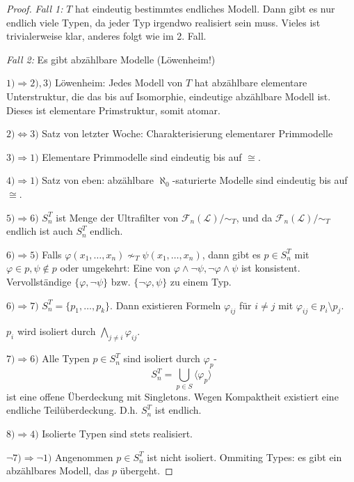 \documentclass[12pt,parskip=full]{scrartcl}
\newcommand{\heading}{\underline}
\theoremstyle{definition}
\begin{document}
	\begin{proof}
		\textit{Fall 1:} $T$ hat eindeutig bestimmtes endliches Modell. Dann gibt es nur endlich viele Typen, da jeder Typ irgendwo realisiert sein muss. Vieles ist trivialerweise klar, anderes folgt wie im 2. Fall.
		
		\textit{Fall 2:} Es gibt abzählbare Modelle (Löwenheim!)
		
		\heading{$1) \Rightarrow 2),3)$} Löwenheim: Jedes Modell von $T$ hat abzählbare elementare Unterstruktur, die das bis auf Isomorphie, eindeutige abzählbare Modell ist. Dieses ist elementare Primstruktur, somit atomar.
		
		\heading{$2) \Leftrightarrow 3)$} Satz von letzter Woche: Charakterisierung elementarer Primmodelle
		
		\heading{$3) \Rightarrow 1)$} Elementare Primmodelle sind eindeutig bis auf $\cong$.
		
		\heading{$4) \Rightarrow 1)$} Satz von eben: abzählbare $\aleph_0$-saturierte Modelle sind eindeutig bis auf $\cong$.
		
		\heading{$5) \Rightarrow 6)$} $S_n^T$ ist Menge der Ultrafilter von $\mathcal{F}_n(\mathcal{L})/\sim_T$, und da $\mathcal{F}_n(\mathcal{L})/\sim_T$ endlich ist auch $S_n^T$ endlich.
		
		\heading{$6) \Rightarrow 5)$} Falls $\varphi(x_1, \dots, x_n) \nsim_T \psi(x_1, \dots, x_n)$, dann gibt es $p \in S_n^T$ mit $\varphi \in p, \psi \notin p$ oder umgekehrt: Eine von $\varphi \land \lnot \psi, \lnot \varphi \land \psi$ ist konsistent. Vervollständige $\{ \varphi, \lnot \psi \}$ bzw. $\{ \lnot \varphi, \psi \}$ zu einem Typ.
		
		\heading{$6) \Rightarrow 7)$} $S_n^T = \{ p_1, \dots, p_k \}$. Dann existieren Formeln $\varphi_{ij}$ für $i \neq j$ mit $\varphi_{ij} \in p_i \setminus p_j$.
		
		$p_i$ wird isoliert durch $\bigwedge_{j \neq i} \varphi_{ij}$.
		
		\heading{$7) \Rightarrow 6)$} Alle Typen $p \in S_n^T$ sind isoliert durch $\varphi_p$-
		\begin{equation*}
			S_n^T = \bigcup_{p \in S} \langle \varphi_p \rangle
		\end{equation*}
		ist eine offene Überdeckung mit Singletons. Wegen Kompaktheit existiert eine endliche Teilüberdeckung. D.h. $S_n^T$ ist endlich.
		
		\heading{$8) \Rightarrow 4)$} Isolierte Typen sind stets realisiert.
		
		\heading{$\lnot 7) \Rightarrow \lnot 1)$} Angenommen $p \in S_n^T$ ist nicht isoliert. Ommiting Types: es gibt ein abzählbares Modell, das $p$ übergeht.
		

\end{proof}
\end{document}
